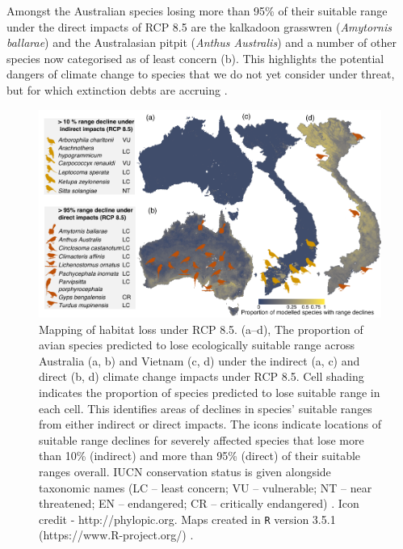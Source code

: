 \documentclass[titlesmallcaps,copyrightpage]{uomthesis}\usepackage[]{graphicx}\usepackage[]{color}
\begin{document}
Amongst the Australian species losing more than 95\% of their suitable range under the direct impacts of RCP 8.5 are the kalkadoon grasswren (\textit{Amytornis ballarae}) and the Australasian pitpit (\textit{Anthus Australis}) and a number of other species now categorised as of least concern (b). This highlights the potential dangers of climate change to species that we do not yet consider under threat, but for which extinction debts are accruing \citep{kuussaari_extinction_2009}.

\begin{figure}[htb]
  \centering
  \includegraphics[width=\textwidth]{chapters/figures/chapter2/fig4.pdf}
  \caption{Mapping of habitat loss under RCP 8.5. (a–d),  The proportion of avian species predicted to lose ecologically suitable range across Australia (a, b) and Vietnam (c, d) under the indirect (a, c) and direct (b, d) climate change impacts under RCP 8.5. Cell shading indicates the proportion of species predicted to lose suitable range in each cell.  This identifies areas of declines in species’ suitable ranges from either indirect or direct impacts. The icons indicate locations of suitable range declines for severely affected species that lose more than 10\% (indirect) and more than 95\% (direct) of their suitable ranges overall. IUCN conservation status is given alongside taxonomic names (LC – least concern; VU – vulnerable; NT – near threatened; EN – endangered; CR – critically endangered) \citep{iucn_iucn_2018}. Icon credit - http://phylopic.org.  Maps created in \texttt{R} version 3.5.1 (https://www.R-project.org/) \citep{r_development_core_team_r_2008}.}
  \label{ch2:fig4}
\end{figure}
\end{document}
